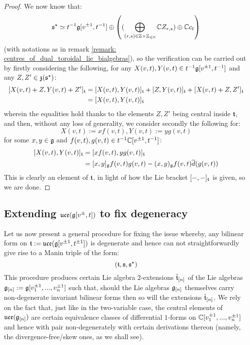                 \begin{proof}
                    We now know that:
                        $$\s^{\star} \cong t^{-1}\g[v^{\pm 1}, t^{-1}] \oplus \left( ( \bigoplus_{(r, s) \in \Z \x \Z_{\leq 0}} \bbC Z_{r, s}) \oplus \bbC c_t \right)$$
                    (with notations as in remark \ref{remark: centres_of_dual_toroidal_lie_bialgebras}), so the verification can be carried out by firstly considering the following, for any $X(v, t), Y(v, t) \in t^{-1}\mathfrak{g}[v^{\pm 1}, t^{-1}]$ and any $Z, Z' \in \mathfrak{z}(\mathfrak{s}^{\star})$:
                        $$
                            \begin{aligned}
                                [ X(v, t) + Z, Y(v, t) + Z' ]_{\t} & = [ X(v, t), Y(v, t) ]_{\t} + [ Z, Y(v, t) ]_{\t} + [X(v, t) + Z, Z']_{\t}
                                \\
                                & = [ X(v, t), Y(v, t) ]_{\t}
                            \end{aligned}
                        $$
                    wherein the equalities hold thanks to the elements $Z, Z'$ being central inside $\mathfrak{t}$, and then, without any loss of generality, we consider secondly the following for:
                        $$X(v, t) := x f(v, t), Y(v, t) := y g(v, t)$$
                    for some $x, y \in \mathfrak{g}$ and $f(v, t), g(v, t) \in t^{-1}\mathbb{C}[v^{\pm 1}, t^{-1}]$:
                        $$
                            \begin{aligned}
                                [ X(v, t), Y(v, t) ]_{\t} & = [ x f(v, t), y g(v, t) ]_{\t}
                                \\
                                & = [x, y]_{\g} f(v, t) g(v, t) - (x, y)_{\g} f(v, t) \overline{d}( g(v, t) )
                            \end{aligned}
                        $$
                    This is clearly an element of $\mathfrak{t}$, in light of how the Lie bracket $[-, -]_{\mathfrak{t}}$ is given, so we are done. 
                \end{proof}

        \subsection{Extending \texorpdfstring{$ \mathfrak{uce}(\mathfrak{g}[v^{\pm}, t]) $}{} to fix degeneracy}
            Let us now present a general procedure for fixing the issue whereby, any bilinear form on $\mathfrak{t} := \mathfrak{uce}(\mathfrak{g}[v^{\pm 1}, t^{\pm 1}])$ is degenerate and hence can not straightforwardly give rise to a Manin triple of the form:
                $$(\mathfrak{t}, \mathfrak{s}, \mathfrak{s}^{\star})$$
            This procedure produces certain Lie algebra $2$-extensions $\hat{\mathfrak{t}}_{[n]}$ of the Lie algebras $\mathfrak{g}_{[n]} := \mathfrak{g}[v_1^{\pm 1}, ..., v_n^{\pm 1}]$ such that, should the Lie algebras $\mathfrak{g}_{[n]}$ themselves carry non-degenerate invariant bilinear forms then so will the extensions $\hat{\mathfrak{t}}_{[n]}$. We rely on the fact that, just like in the two-variable case, the central elements of $\mathfrak{uce}(\mathfrak{g}_{[n]})$ are certain equivalence classes of differential $1$-forms on $\mathbb{C}[v_1^{\pm 1}, ..., v_n^{\pm 1}]$ and hence with pair non-degenerately with certain derivations thereon (namely, the divergence-free/skew ones, as we shall see).
        
